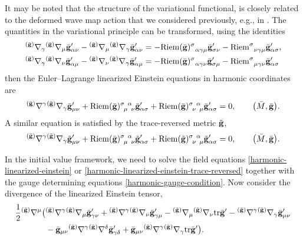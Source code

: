 \documentclass[11pt]{article}
\numberwithin{equation}{section}
\def\grad{{\nabla}}%
\newcommand{\leftexp}[2]{{\vphantom{#2}}^{#1}{#2}}
\def\halb{\frac{1}{2}}%
\def \gm{\gamma}
\def \a{\alpha}
\renewcommand{\gg}{{\bf g}}
\newcommand{\bgg}{{\bar{\bf g}}}
\newcommand{\tgg}{{\tilde{\bf g}}}
\renewcommand{\a}{\alpha}
\renewcommand{\d}{\delta}
\numberwithin{equation}{section}
\begin{document}
It may be noted that the structure of the variational functional, is closely related to the deformed wave map action that we considered previously, e.g., in \cite{NG_19_2}. The quantities in the variational principle can be transformed, using the identities
\begin{align*}
&\leftexp{(\bar{\gg})}{\grad}_\gamma \leftexp{(\bar{\gg})}{\grad}_\mu \bgg'_{\a \nu} - \leftexp{(\bar{\gg})}{\grad}_\mu \leftexp{(\bar{\gg})}{\grad}_\gm \bgg'_{\a \nu} = -{\rm Riem}(\bgg)^\sigma_{\,\,\,\,\a \gm \mu} \bgg'_{\sigma \nu} - {\rm Riem}^\sigma_{\,\,\,\, \nu \gm \mu} \bgg'_{\a \sigma}, \notag\\
&\leftexp{(\bar{\gg})}{\grad}_\gamma \leftexp{(\bar{\gg})}{\grad}_\nu \bgg'_{\a \mu} - \leftexp{(\bar{\gg})}{\grad}_\nu \leftexp{(\bar{\gg})}{\grad}_\gm \bgg'_{\a \mu} = -{\rm Riem}(\bgg)^\sigma_{\,\,\,\,\a \gm \nu} \bgg'_{\sigma \mu} - {\rm Riem}^\sigma_{\,\,\,\, \mu \gm \nu} \bgg'_{\a \sigma}
\end{align*}
then the Euler--Lagrange linearized Einstein equations in harmonic coordinates are
\begin{align} \label{harmonic-linearized-einstein}
\leftexp{(\bgg)}{\grad}^\gm \leftexp{(\bar{\gg})}{\grad}_\gm \bgg'_{\mu \nu} + {\rm Riem}(\bgg)^{\sigma \,\,\,\a}_{\,\,\,\mu\,\,\,\nu} \bgg'_{\a \sigma} + {\rm Riem}(\bgg)^{\sigma \,\,\,\a}_{\,\,\,\nu\,\,\,\mu} \bgg'_{\a \sigma} =0, \qquad \bigl(\bar{M}, \bgg\bigr).
\end{align}
A similar equation is satisfied by the trace-reversed metric $\tgg$,
\begin{align} \label{harmonic-linearized-einstein-trace-reversed}
\leftexp{(\bgg)}{\grad}^\gm \leftexp{(\bar{\gg})}{\grad}_\gm \tgg'_{\mu \nu} + {\rm Riem}(\bgg)^{\sigma \,\,\,\a}_{\,\,\,\mu\,\,\,\nu} \tgg'_{\a \sigma} + {\rm Riem}(\tgg)^{\sigma \,\,\,\a}_{\,\,\,\nu\,\,\,\mu} \tgg'_{\a \sigma} =0, \qquad \bigl(\bar{M}, \bgg\bigr).
\end{align}

In the initial value framework, we need to solve the field equations \eqref{harmonic-linearized-einstein} or \eqref{harmonic-linearized-einstein-trace-reversed} together with the gauge determining equations \eqref{harmonic-gauge-condition}.
Now consider the divergence of the linearized Einstein tensor,
\begin{align*}
&\halb \leftexp{(\bgg)}{\grad}^ \mu \bigl( \leftexp{(\bgg)}{\grad}^\gm \leftexp{(\bgg)}{\grad}_\mu \bgg'_{ \gm \nu} + \leftexp{(\bgg)}{\grad}^\gm \leftexp{(\bgg)}{\grad}_\nu \bgg'_{\gm \mu} - \leftexp{(\bgg)}{\grad}_\mu \leftexp{(\bgg)}{\grad}_\nu {\rm tr}\bgg' - \leftexp{(\bgg)}{\grad}^\gm \leftexp{(\bgg)}{\grad}_\gm \bgg'_{ \mu \nu} \notag\\
&\hphantom{\halb \leftexp{(\bgg)}{\grad}^ \mu \bigl(}{}
- \bgg_{\mu \nu} \leftexp{(\bgg)}{\grad}^\gm \leftexp{(\bgg)}{\grad}^\d \bgg'_{ \gm \d} + \bgg_{\mu \nu} \leftexp{(\bgg)}{\grad}^\gm \leftexp{(\bgg)}{\grad}_\gm {\rm tr} \bgg' \bigr).
\end{align*}
\end{document}
